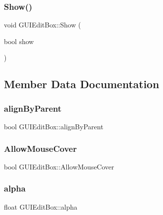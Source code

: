 \hypertarget{class_g_u_i_edit_box_a8177e1d42fc17571f3f427f3637b58f2}{}\label{class_g_u_i_edit_box_a8177e1d42fc17571f3f427f3637b58f2} 
\subsubsection{\texorpdfstring{Show()}{Show()}}
{\footnotesize\ttfamily void G\+U\+I\+Edit\+Box\+::\+Show (\begin{DoxyParamCaption}\item[{bool}]{show }\end{DoxyParamCaption})}



\subsection{Member Data Documentation}
\hypertarget{class_g_u_i_edit_box_ab3920132459fd6c61bf4e85d58fae827}{}\label{class_g_u_i_edit_box_ab3920132459fd6c61bf4e85d58fae827} 
\subsubsection{\texorpdfstring{align\+By\+Parent}{alignByParent}}
{\footnotesize\ttfamily bool G\+U\+I\+Edit\+Box\+::align\+By\+Parent}

\hypertarget{class_g_u_i_edit_box_a622aab637b11e4d3b4b1eba252f267a6}{}\label{class_g_u_i_edit_box_a622aab637b11e4d3b4b1eba252f267a6} 
\subsubsection{\texorpdfstring{Allow\+Mouse\+Cover}{AllowMouseCover}}
{\footnotesize\ttfamily bool G\+U\+I\+Edit\+Box\+::\+Allow\+Mouse\+Cover}

\hypertarget{class_g_u_i_edit_box_abdc44d82ad27f3ed3e17301086dcb1fa}{}\label{class_g_u_i_edit_box_abdc44d82ad27f3ed3e17301086dcb1fa} 
\subsubsection{\texorpdfstring{alpha}{alpha}}
{\footnotesize\ttfamily float G\+U\+I\+Edit\+Box\+::alpha}

